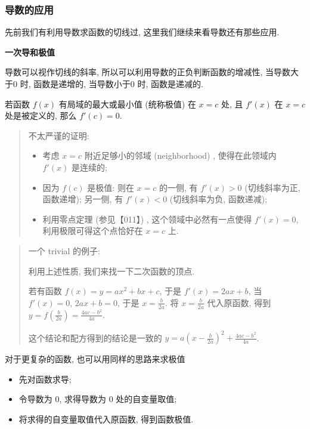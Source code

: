 \hypertarget{ux5bfcux6570ux7684ux5e94ux7528}{%
\subsubsection{导数的应用}\label{ux5bfcux6570ux7684ux5e94ux7528}}

先前我们有利用导数求函数的切线过, 这里我们继续来看导数还有那些应用.

\textbf{一次导和极值}

导数可以视作切线的斜率, 所以可以利用导数的正负判断函数的增减性,
当导数大于\(0\) 时, 函数是递增的, 当导数小于\(0\) 时, 函数是递减的.

若函数 \(f(x)\) 有局域的最大或最小值 (统称极值) 在 \(x=c\) 处, 且
\(f'(x)\) 在 \(x=c\) 处是被定义的, 那么 \(f'(c)=0\).

\begin{quote}
不太严谨的证明:

\begin{itemize}
\tightlist
\item
  考虑 \(x=c\) 附近足够小的邻域 (neighborhood) , 使得在此领域内
  \(f'(x)\) 是连续的;
\item
  因为 \(f(c)\) 是极值: 则在 \(x=c\) 的一侧, 有 \(f'(x)>0\)
  (切线斜率为正, 函数递增); 另一侧, 有 \(f'(x)<0\) (切线斜率为负,
  函数递减);
\item
  利用零点定理 (参见【011】) , 这个领域中必然有一点使得 \(f'(x)=0\),
  利用极限可得这个点恰好在 \(x=c\) 上.
\end{itemize}
\end{quote}

\begin{quote}
一个 trivial 的例子:

利用上述性质, 我们来找一下二次函数的顶点.

若有函数 \(f(x)=y=ax^2+bx+c\), 于是 \(f'(x)=2ax+b\), 当 \(f'(x)=0\),
\(2ax+b=0\), 于是 \(x=\frac{b}{2a}\). 将 \(x=\frac{b}{2a}\) 代入原函数,
得到 \(y=f\left(\frac{b}{2a}\right)=\frac{4ac-b^2}{4a}\).

这个结论和配方得到的结论是一致的
\(y=a\left(x-\frac{b}{2a}\right)^2+\frac{4ac-b^2}{4a}\).
\end{quote}

对于更复杂的函数, 也可以用同样的思路来求极值

\begin{itemize}
\tightlist
\item
  先对函数求导;
\item
  令导数为 \(0\), 求得导数为 \(0\) 处的自变量取值;
\item
  将求得的自变量取值代入原函数, 得到函数极值.
\end{itemize}

